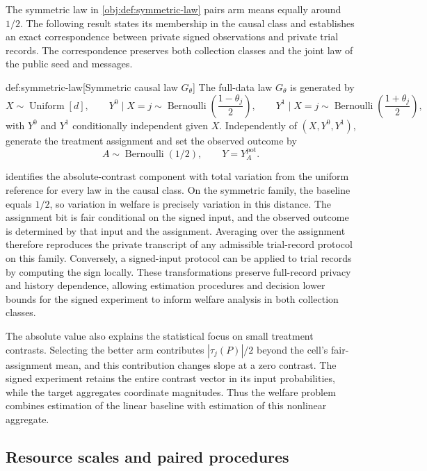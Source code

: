 The symmetric law  in \cref{obj:def:symmetric-law} pairs arm means equally around \(1/2\). The following result states its membership in the causal class and establishes an exact correspondence between private signed observations and private trial records. The correspondence preserves both collection classes and the joint law of the public seed and messages.

\begin{definitionv}{def:symmetric-law}[Symmetric causal law $G_\theta$]
The full-data law \(G_\theta\) is generated by
\[
X\sim\operatorname{Uniform}[d],
\qquad
Y^0\mid X=j\sim\operatorname{Bernoulli}\!\left(\frac{1-\theta_j}{2}\right),
\qquad
Y^1\mid X=j\sim\operatorname{Bernoulli}\!\left(\frac{1+\theta_j}{2}\right),
\]
with \(Y^0\) and \(Y^1\) conditionally independent given \(X\). Independently of \((X,Y^0,Y^1)\), generate the treatment assignment and set the observed outcome by
\[
A\sim\operatorname{Bernoulli}(1/2),
\qquad
Y=Y^{\mathrm{pot}}_A.
\]
\end{definitionv}

 identifies the absolute-contrast component with total variation from the uniform reference for every law in the causal class. On the symmetric family, the baseline equals \(1/2\), so variation in welfare is precisely variation in this distance. The assignment bit is fair conditional on the signed input, and the observed outcome is determined by that input and the assignment. Averaging over the assignment therefore reproduces the private transcript of any admissible trial-record protocol on this family. Conversely, a signed-input protocol can be applied to trial records by computing the sign locally. These transformations preserve full-record privacy and history dependence, allowing estimation procedures and decision lower bounds for the signed experiment to inform welfare analysis in both collection classes.

The absolute value also explains the statistical focus on small treatment contrasts. Selecting the better arm contributes \(|\tau_j(P)|/2\) beyond the cell's fair-assignment mean, and this contribution changes slope at a zero contrast. The signed experiment retains the entire contrast vector in its input probabilities, while the target aggregates coordinate magnitudes. Thus the welfare problem combines estimation of the linear baseline with estimation of this nonlinear aggregate.

\subsection{Resource scales and paired procedures}

